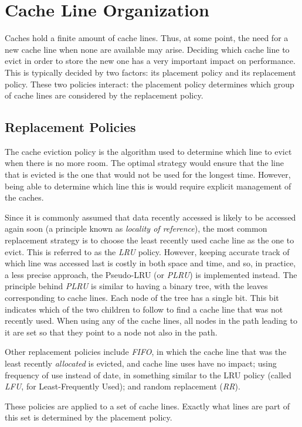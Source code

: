 \section{Cache Line Organization}
Caches hold a finite amount of cache lines. Thus, at some point, the need for a
new cache line when none are available may arise. Deciding which cache line to
evict in order to store the new one has a very important impact on performance.
This is typically decided by two factors: its placement policy and its
replacement policy. These two policies interact: the placement policy determines
which group of cache lines are considered by the replacement policy.

\subsection{Replacement Policies}
The cache eviction policy is the algorithm used to determine which line to
evict when there is no more room. The optimal strategy would ensure that the
line that is evicted is the one that would not be used for the longest time.
However, being able to determine which line this is would require explicit
management of the caches.

Since it is commonly assumed that data recently accessed is likely to be
accessed again soon (a principle known as \textit{locality of reference}), the
most common replacement strategy is to choose the least recently used cache
line as the one to evict. This is referred to as the \textit{LRU} policy.
However, keeping accurate track of which line was accessed last is costly in
both space and time, and so, in practice, a less precise approach, the
Pseudo-LRU (or \textit{PLRU}) is implemented instead. The principle behind
\textit{PLRU} is similar to having a binary tree, with the leaves corresponding
to cache lines. Each node of the tree has a single bit. This bit indicates which
of the two children to follow to find a cache line that was not recently used.
When using any of the cache lines, all nodes in the path leading to it are set
so that they point to a node not also in the path.

Other replacement policies include \textit{FIFO}, in which the cache line that
was the least recently \textit{allocated} is evicted, and cache line uses have
no impact; using frequency of use instead of date, in something similar to the
LRU policy (called \textit{LFU}, for Least-Frequently Used); and random
replacement (\textit{RR}).

These policies are applied to a set of cache lines. Exactly what lines are part
of this set is determined by the placement policy.

